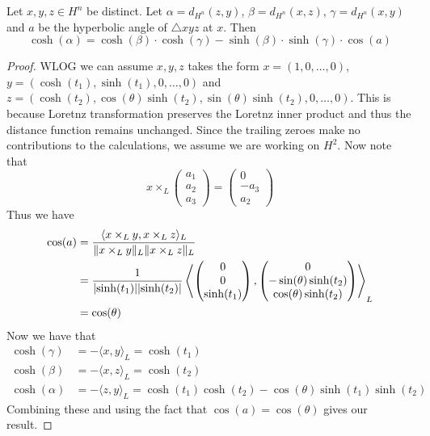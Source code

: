 \documentclass[a4paper]{article}
\begin{document}
\begin{thm}{}{} Let $x,y,z\in H^n$ be distinct. Let $\alpha=d_{H^n}(z,y)$, $\beta=d_{H^n}(x,z)$, $\gamma=d_{H^n}(x,y)$ and $a$ be the hyperbolic angle of $\triangle xyz$ at $x$. Then $$\cosh(\alpha)=\cosh(\beta)\cdot\cosh(\gamma)-\sinh(\beta)\cdot\sinh(\gamma)\cdot\cos(a)$$ \tcbline
\begin{proof}
WLOG we can assume $x,y,z$ takes the form $x=(1,0,\dots,0)$, $y=(\cosh(t_1),\sinh(t_1),0,\dots,0)$ and $z=(\cosh(t_2),\cos(\theta)\sinh(t_2),\sin(\theta)\sinh(t_2),0,\dots,0)$. This is because Loretnz transformation preserves the Loretnz inner product and thus the distance function remains unchanged. Since the trailing zeroes make no contributions to the calculations, we assume we are working on $H^2$. Now note that $$x\times_L\begin{pmatrix}a_1\\a_2\\a_3\end{pmatrix}=\begin{pmatrix}0\\-a_3\\a_2\end{pmatrix}$$ Thus we have 
\begin{align*}
\cos(a)&=\frac{\langle x\times_Ly,x\times_Lz\rangle_L}{\|x\times_Ly\|_L\|x\times_Lz\|_L}\\
&=\frac{1}{\abs{\sinh(t_1)}\abs{\sinh(t_2)}}\left\langle\begin{pmatrix}0\\0\\\sinh(t_1)\end{pmatrix},\begin{pmatrix}0\\-\sin(\theta)\sinh(t_2)\\\cos(\theta)\sinh(t_2)\end{pmatrix}\right\rangle_L\\
&=\cos(\theta)
\end{align*}
Now we have that 
\begin{align*}
\cosh(\gamma)&=-\langle x,y\rangle_L=\cosh(t_1)\\
\cosh(\beta)&=-\langle x,z\rangle_L=\cosh(t_2)\\
\cosh(\alpha)&=-\langle z,y\rangle_L=\cosh(t_1)\cosh(t_2)-\cos(\theta)\sinh(t_1)\sinh(t_2)
\end{align*}
Combining these and using the fact that $\cos(a)=\cos(\theta)$ gives our result. 
\end{proof}
\end{thm}
\end{document}
